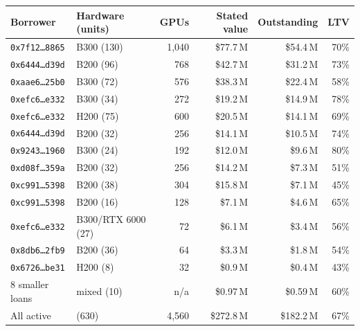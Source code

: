 \begin{tabular}{@{}llrrrr@{}}
\toprule
Borrower & Hardware (units) & GPUs & Stated value & Outstanding & LTV \\
\midrule
\texttt{0x7f12\ldots{}8865} & B300 (130) & 1,040 & \$77.7\,M & \$54.4\,M & 70\% \\
\texttt{0x6444\ldots{}d39d} & B200 (96) & 768 & \$42.7\,M & \$31.2\,M & 73\% \\
\texttt{0xaae6\ldots{}25b0} & B300 (72) & 576 & \$38.3\,M & \$22.4\,M & 58\% \\
\texttt{0xefc6\ldots{}e332} & B300 (34) & 272 & \$19.2\,M & \$14.9\,M & 78\% \\
\texttt{0xefc6\ldots{}e332} & H200 (75) & 600 & \$20.5\,M & \$14.1\,M & 69\% \\
\texttt{0x6444\ldots{}d39d} & B200 (32) & 256 & \$14.1\,M & \$10.5\,M & 74\% \\
\texttt{0x9243\ldots{}1960} & B300 (24) & 192 & \$12.0\,M & \$9.6\,M & 80\% \\
\texttt{0xd08f\ldots{}359a} & B200 (32) & 256 & \$14.2\,M & \$7.3\,M & 51\% \\
\texttt{0xc991\ldots{}5398} & B200 (38) & 304 & \$15.8\,M & \$7.1\,M & 45\% \\
\texttt{0xc991\ldots{}5398} & B200 (16) & 128 & \$7.1\,M & \$4.6\,M & 65\% \\
\texttt{0xefc6\ldots{}e332} & B300/RTX 6000 (27) & 72 & \$6.1\,M & \$3.4\,M & 56\% \\
\texttt{0x8db6\ldots{}2fb9} & B200 (36) & 64 & \$3.3\,M & \$1.8\,M & 54\% \\
\texttt{0x6726\ldots{}be31} & H200 (8) & 32 & \$0.9\,M & \$0.4\,M & 43\% \\
8 smaller loans & mixed (10) & n/a & \$0.97\,M & \$0.59\,M & 60\% \\
\midrule
All active & (630) & 4,560 & \$272.8\,M & \$182.2\,M & 67\% \\
\bottomrule
\end{tabular}
